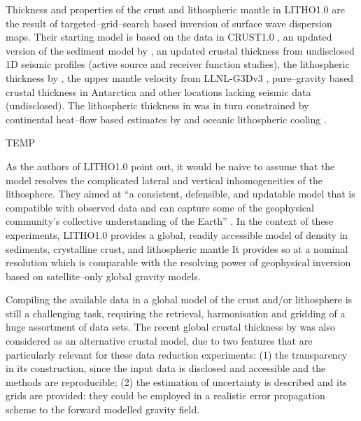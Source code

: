 Thickness and properties of the crust and lithospheric mantle in {LITHO1.0} are the result of targeted--grid--search based inversion of surface wave dispersion maps.
Their starting model is based on the data in {CRUST1.0} \parencite{Laske2012Crust10}, an updated version of the sediment model by \textcite{Laske1997_sediments}, an updated crustal thickness from undisclosed 1D seismic profiles (active source and receiver function studies), the lithospheric thickness by \textcite{Pasyanos2005}, the upper mantle velocity from {LLNL-G3Dv3} \parencite{Simmons2012_LLNL}, pure--gravity based crustal thickness in Antarctica \parencite{Block2009} and other locations lacking seismic data (undisclosed).
The lithospheric thickness in \textcite{Pasyanos2005} was in turn constrained by continental heat--flow based estimates by \textcite{Artemieva2006} and oceanic lithospheric cooling \parencite{Turcotte1982_geodynamics}.

\begin{table}
    \begin{adjustbox}{center}
        
    \end{adjustbox}
    \caption[TEMP]{TEMP}
    \label{tab:LithoLayers}
\end{table}

As the authors of {LITHO1.0} point out, it would be naive to assume that the model resolves the complicated lateral and vertical inhomogeneities of the lithosphere.
They aimed at ``a consistent, defensible, and updatable model that is compatible with observed data and can capture some of the geophysical community's collective understanding of the Earth'' \parencite{Pasyanos2014}.
In the context of these experiments, {LITHO1.0} provides a global, readily accessible model of density in sediments, crystalline crust, and lithospheric mantle
It provides so at a nominal resolution which is comparable with the resolving power of geophysical inversion based on satellite--only global gravity models.

Compiling the available data in a global model of the crust and/or lithosphere is still a challenging task, requiring the retrieval, harmonisation and gridding of a huge assortment of data sets.
The recent global crustal thickness by \textcite{Szwillus2019} was also considered as an alternative crustal model, due to two features that are particularly relevant for these data reduction experiments:
(1) the transparency in its construction, since the input data is disclosed and accessible \parencite{Mooney2015_globalcrust} and the methods are reproducible;
(2) the estimation of uncertainty is described and its grids are provided: they could be employed in a realistic error propagation scheme to the forward modelled gravity field.

